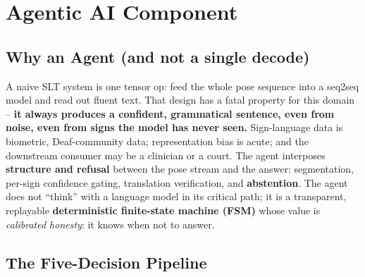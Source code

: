 \documentclass[12pt,a4paper]{article}
\begin{document}
\section{Agentic AI Component}

\subsection{Why an Agent (and not a single decode)}

A naive SLT system is one tensor op: feed the whole pose sequence into a seq2seq model and read out fluent text. That design has a fatal property for this domain -- \textbf{it always produces a confident, grammatical sentence, even from noise, even from signs the model has never seen.} Sign-language data is biometric, Deaf-community data; representation bias is acute; and the downstream consumer may be a clinician or a court. The agent interposes \textbf{structure and refusal} between the pose stream and the answer: segmentation, per-sign confidence gating, translation verification, and \textbf{abstention}. The agent does not ``think'' with a language model in its critical path; it is a transparent, replayable \textbf{deterministic finite-state machine (FSM)} whose value is \emph{calibrated honesty}: it knows when not to answer.

\subsection{The Five-Decision Pipeline}
\end{document}
